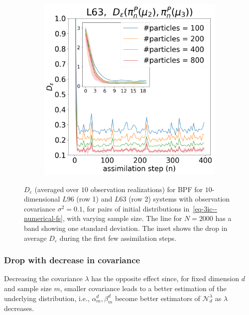 \begin{figure}[!t]
\begin{subfigure}{0.3\textwidth}
\end{subfigure}\hspace{0mm}%
\begin{subfigure}{0.3\textwidth}
\includegraphics[width=\columnwidth]{stability/plots/figures-BPF-L63-1-dist_2_vs_3.png}
\end{subfigure}\hspace{0mm}
\caption{$D_\varepsilon$ (averaged over $10$ observation realizations) for BPF for $10$-dimensional $L96$ (row 1) and $L63$ (row 2) systems with observation covariance $\sigma^2=0.1$, for pairs of initial distributions in~\eqref{eq-3ic--numerical-fs}, with varying sample size. The line for $N = 2000$ has a band showing one standard deviation. The inset shows the drop in average $D_\varepsilon$ during the first few assimilation steps.}
\label{fig:plot-BPF--numerical-fs}
\end{figure}

\subsubsection{Drop with decrease in covariance} Decreasing the covariance $\lambda$ has the opposite effect since, for fixed dimension $d$ and sample size $m$, smaller covariance leads to a better estimation of the underlying distribution, i.e., $\alpha_m^d, \beta_m^d$ become better estimators of $\mathcal N_d^\lambda$ as $\lambda$ decreases.

